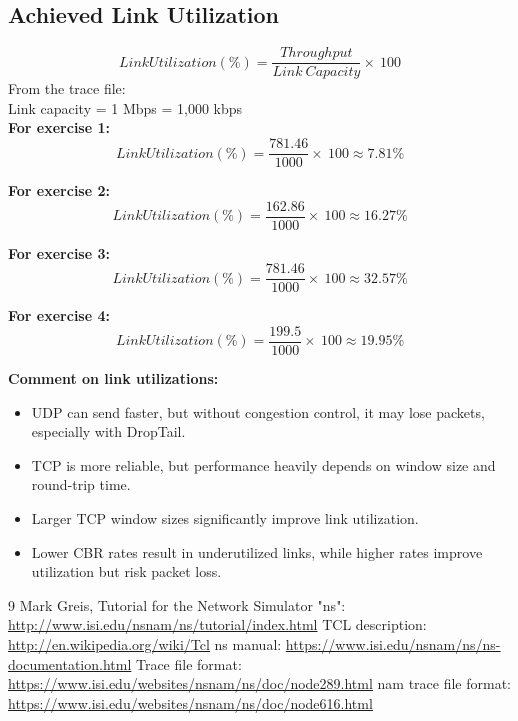 \documentclass[12pt]{article}
\begin{document}
	
	\subsection{Achieved Link Utilization}
	
	\begin{equation*}
	Link Utilization (\%)=\frac{Throughput}{Link\ Capacity}\times~100
	\end{equation*}
	\noindent
	From the trace file: \\
	Link capacity = 1 Mbps = 1,000 kbps \\
	
	\textbf{For exercise 1:}
	\begin{equation*}
		Link Utilization (\%)=\frac{781.46}{1000}\times~100 \approx 7.81\%
	\end{equation*}
	
	\textbf{For exercise 2:}
	\begin{equation*}
		Link Utilization (\%)=\frac{162.86}{1000}\times~100 \approx 16.27\%
	\end{equation*}
	
	\textbf{For exercise 3:}
	\begin{equation*}
		Link Utilization (\%)=\frac{781.46}{1000}\times~100 \approx 32.57\%
	\end{equation*}
	
	\textbf{For exercise 4:}
	\begin{equation*}
		Link Utilization (\%)=\frac{199.5}{1000}\times~100 \approx 19.95\%
	\end{equation*}
	
	\noindent
	\textbf{Comment on link utilizations:}
	\begin{itemize}
		\item UDP can send faster, but without congestion control, it may lose packets, especially with DropTail.
		\item TCP is more reliable, but performance heavily depends on window size and round-trip time.
		\item Larger TCP window sizes significantly improve link utilization.
		\item Lower CBR rates result in underutilized links, while higher rates improve utilization but risk packet loss.
	\end{itemize}
	
	
	
	\begin{thebibliography}{9}
		 Mark Greis, Tutorial for the Network Simulator "ns": \url{http://www.isi.edu/nsnam/ns/tutorial/index.html}
		 TCL description: \url{http://en.wikipedia.org/wiki/Tcl}
		 ns manual: \url{https://www.isi.edu/nsnam/ns/ns-documentation.html}
		 Trace file format: \url{https://www.isi.edu/websites/nsnam/ns/doc/node289.html}
		 nam trace file format: \url{https://www.isi.edu/websites/nsnam/ns/doc/node616.html}
	\end{thebibliography}
\end{document}
